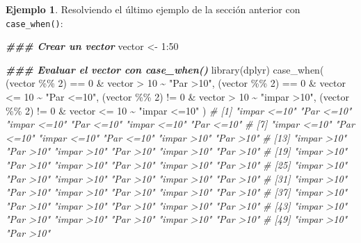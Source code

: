 \documentclass[
]{article}
\newenvironment{Shaded}{\begin{snugshade}}{\end{snugshade}}
\newcommand{\CommentTok}[1]{\textcolor[rgb]{0.56,0.35,0.01}{\textit{#1}}}
\newcommand{\DecValTok}[1]{\textcolor[rgb]{0.00,0.00,0.81}{#1}}
\newcommand{\DocumentationTok}[1]{\textcolor[rgb]{0.56,0.35,0.01}{\textbf{\textit{#1}}}}
\newcommand{\FunctionTok}[1]{\textcolor[rgb]{0.00,0.00,0.00}{#1}}
\newcommand{\NormalTok}[1]{#1}
\newcommand{\OtherTok}[1]{\textcolor[rgb]{0.56,0.35,0.01}{#1}}
\newcommand{\SpecialCharTok}[1]{\textcolor[rgb]{0.00,0.00,0.00}{#1}}
\newcommand{\StringTok}[1]{\textcolor[rgb]{0.31,0.60,0.02}{#1}}
\theoremstyle{definition}
\theoremstyle{definition}
\newtheorem{example}{Ejemplo}[section]
\theoremstyle{definition}
\theoremstyle{definition}
\theoremstyle{remark}
\begin{document}
\begin{example}

Resolviendo el último ejemplo de la sección anterior con \texttt{case\_when()}:

\begin{Shaded}
\begin{Highlighting}[]
\DocumentationTok{\#\#\# Crear un vector}
\NormalTok{vector }\OtherTok{\textless{}{-}} \DecValTok{1}\SpecialCharTok{:}\DecValTok{50}

\DocumentationTok{\#\#\# Evaluar el vector con case\_when()}
\FunctionTok{library}\NormalTok{(dplyr)}
\FunctionTok{case\_when}\NormalTok{(}
\NormalTok{  (vector }\SpecialCharTok{\%\%} \DecValTok{2}\NormalTok{) }\SpecialCharTok{==} \DecValTok{0} \SpecialCharTok{\&}\NormalTok{ vector }\SpecialCharTok{\textgreater{}} \DecValTok{10} \SpecialCharTok{\textasciitilde{}} \StringTok{"Par \textgreater{}10"}\NormalTok{,}
\NormalTok{  (vector }\SpecialCharTok{\%\%} \DecValTok{2}\NormalTok{) }\SpecialCharTok{==} \DecValTok{0} \SpecialCharTok{\&}\NormalTok{ vector }\SpecialCharTok{\textless{}=} \DecValTok{10} \SpecialCharTok{\textasciitilde{}} \StringTok{"Par \textless{}=10"}\NormalTok{,}
\NormalTok{  (vector }\SpecialCharTok{\%\%} \DecValTok{2}\NormalTok{) }\SpecialCharTok{!=} \DecValTok{0} \SpecialCharTok{\&}\NormalTok{ vector }\SpecialCharTok{\textgreater{}} \DecValTok{10} \SpecialCharTok{\textasciitilde{}} \StringTok{"impar \textgreater{}10"}\NormalTok{,}
\NormalTok{  (vector }\SpecialCharTok{\%\%} \DecValTok{2}\NormalTok{) }\SpecialCharTok{!=} \DecValTok{0} \SpecialCharTok{\&}\NormalTok{ vector }\SpecialCharTok{\textless{}=} \DecValTok{10} \SpecialCharTok{\textasciitilde{}} \StringTok{"impar \textless{}=10"}
\NormalTok{)}
\CommentTok{\#  [1] "impar \textless{}=10" "Par \textless{}=10"   "impar \textless{}=10" "Par \textless{}=10"   "impar \textless{}=10" "Par \textless{}=10"  }
\CommentTok{\#  [7] "impar \textless{}=10" "Par \textless{}=10"   "impar \textless{}=10" "Par \textless{}=10"   "impar \textgreater{}10"  "Par \textgreater{}10"   }
\CommentTok{\# [13] "impar \textgreater{}10"  "Par \textgreater{}10"    "impar \textgreater{}10"  "Par \textgreater{}10"    "impar \textgreater{}10"  "Par \textgreater{}10"   }
\CommentTok{\# [19] "impar \textgreater{}10"  "Par \textgreater{}10"    "impar \textgreater{}10"  "Par \textgreater{}10"    "impar \textgreater{}10"  "Par \textgreater{}10"   }
\CommentTok{\# [25] "impar \textgreater{}10"  "Par \textgreater{}10"    "impar \textgreater{}10"  "Par \textgreater{}10"    "impar \textgreater{}10"  "Par \textgreater{}10"   }
\CommentTok{\# [31] "impar \textgreater{}10"  "Par \textgreater{}10"    "impar \textgreater{}10"  "Par \textgreater{}10"    "impar \textgreater{}10"  "Par \textgreater{}10"   }
\CommentTok{\# [37] "impar \textgreater{}10"  "Par \textgreater{}10"    "impar \textgreater{}10"  "Par \textgreater{}10"    "impar \textgreater{}10"  "Par \textgreater{}10"   }
\CommentTok{\# [43] "impar \textgreater{}10"  "Par \textgreater{}10"    "impar \textgreater{}10"  "Par \textgreater{}10"    "impar \textgreater{}10"  "Par \textgreater{}10"   }
\CommentTok{\# [49] "impar \textgreater{}10"  "Par \textgreater{}10"}
\end{Highlighting}
\end{Shaded}


\end{example}
\end{document}

